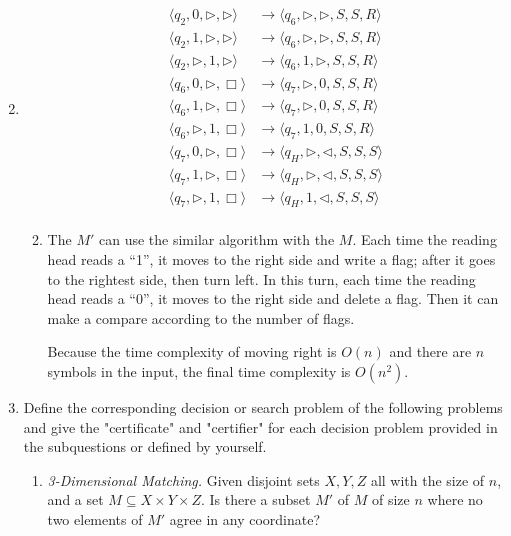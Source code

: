 \documentclass[12pt,a4paper]{article}
\makeatletter
\newtheorem*{solution}{Solution}
\theoremstyle{definition}
\renewenvironment{solution}[1][Solution] {\par\pushQED{\qed}\normalfont\topsep6\p@\@plus6\p@\relax\trivlist\item[\hskip\labelsep\bfseries#1\@addpunct{.}]\ignorespaces}{\popQED\endtrivlist\@endpefalse} \makeatother
\makeatother
\begin{document}
\begin{enumerate}
\begin{solution}
\begin{enumerate}
\begin{align*}
				\langle q_2, 0, \triangleright, \triangleright \rangle &\rightarrow \langle q_6, \triangleright,\triangleright,  S, S, R \rangle\\
				\langle q_2, 1, \triangleright, \triangleright \rangle &\rightarrow \langle q_6, \triangleright,\triangleright,  S, S, R \rangle\\
				\langle q_2,  \triangleright, 1,\triangleright \rangle &\rightarrow \langle q_6, 1,\triangleright,  S, S, R \rangle\\
				\langle q_6, 0, \triangleright, \Box \rangle &\rightarrow \langle q_7, \triangleright,0,  S, S, R \rangle\\
				\langle q_6, 1, \triangleright, \Box \rangle &\rightarrow \langle q_7, \triangleright,0,  S, S, R \rangle\\
				\langle q_6,  \triangleright,1, \Box \rangle &\rightarrow \langle q_7, 1,0,  S, S, R \rangle\\
				\langle q_7, 0, \triangleright, \Box \rangle &\rightarrow \langle q_H, \triangleright,\triangleleft,  S, S, S \rangle\\
				\langle q_7, 1, \triangleright, \Box \rangle &\rightarrow \langle q_H, \triangleright,\triangleleft,  S, S, S \rangle\\
				\langle q_7, \triangleright, 1, \Box \rangle &\rightarrow \langle q_H, 1,\triangleleft,  S, S, S \rangle\\
			\end{align*}
			\item The $ M' $ can use the similar algorithm with the $ M $. Each time the reading head reads a ``1'', it moves to the right side and write a flag; after it goes to the rightest side, then turn left. In this turn, each time the reading head reads a ``0'', it moves to the right side and delete a flag. Then it can make a compare according to the number of flags. 
			
			Because the time complexity of moving right is $ O(n) $ and there are $ n $ symbols in the input, the final time complexity is $ O(n^2) $.
		\end{enumerate}
	\end{solution}
	\item Define the corresponding decision or search problem of the following problems and give the "certificate" and "certifier" for each decision problem provided in the subquestions or defined by yourself.
	
	\begin{enumerate}
	    \item
	    \textit{3-Dimensional Matching.}  Given disjoint sets $X,Y,Z$ all with the size of $n$, and a set $M \subseteq X\times Y\times Z$.  Is there a subset $M'$ of $M$ of size $n$ where no two elements of $M'$ agree in any coordinate?
	    

\end{enumerate}
\end{enumerate}
\end{document}
